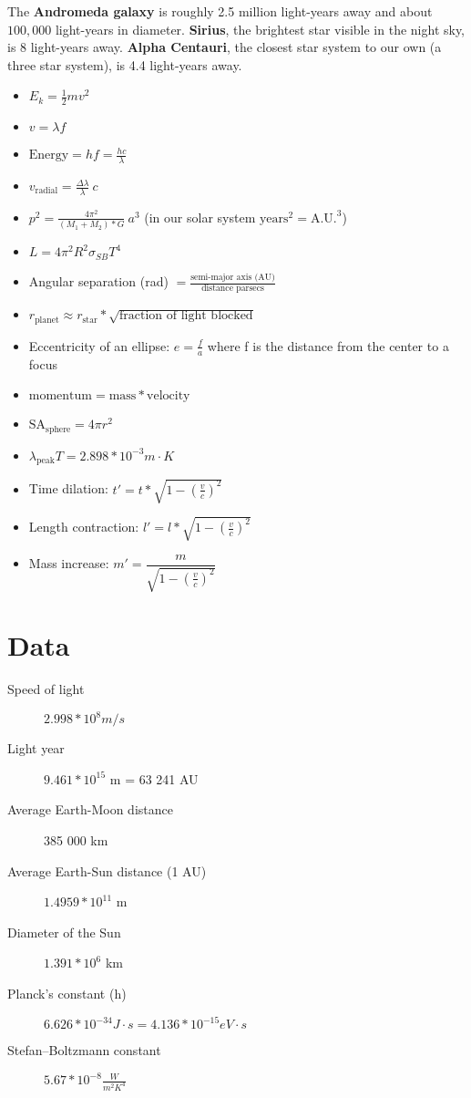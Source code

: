 \documentclass[12pt]{article}
\begin{document}
The {\bf Andromeda galaxy} is roughly 2.5 million light-years away and about $100,000$ light-years in diameter. {\bf Sirius}, the brightest star visible in the night sky, is 8 light-years away. {\bf Alpha Centauri}, the closest star system to our own (a three star system), is 4.4 light-years away.

\begin{itemize}
    \item $E_k = \frac{1}{2}mv^2$
    \item $v = \lambda f$
    \item $\text{Energy} = h f = \frac{hc}{\lambda}$
    \item $v_\text{radial} = \frac{\Delta \lambda}{\lambda}\ c$
    \item $p^2 = \frac{4\pi^2}{(M_1 + M_2) * G}\ a^3$ (in our solar system $\text{years}^2 = \text{A.U.}^3$)
    \item $L = 4\pi^2R^2 \sigma_{SB} T^4$
    \item Angular separation (rad) $= \frac{\text{semi-major axis (AU)}}{\text{distance parsecs}}$
    \item $r_\text{planet} \approx r_\text{star} * \sqrt{\text{fraction of light blocked}}$
    \item Eccentricity of an ellipse: $e = \frac{f}{a}$ where f is the distance from the center to a focus
    \item $\text{momentum} = \text{mass} * \text{velocity}$
    \item $\text{SA}_\text{sphere} = 4 \pi r^2$
    \item $\lambda_\text{peak} T = 2.898 * 10^{-3} m \cdot K$
    \item Time dilation: $t' = t * \sqrt{1 - \left( \frac{v}{c} \right)^2}$
    \item Length contraction: $l' = l * \sqrt{1 - \left( \frac{v}{c} \right)^2}$
    \item Mass increase: $m' = \dfrac{m}{\sqrt{1 - \left( \frac{v}{c} \right)^2}}$
\end{itemize}

\section{Data}

\begin{description}
    \item[Speed of light] $2.998 * 10^8 m/s$
    \item[Light year] $9.461 * 10^{15}$ m = 63 241 AU
    \item[Average Earth-Moon distance] 385 000 km
    \item[Average Earth-Sun distance (1 AU)] $1.4959 * 10^{11}$ m
    \item[Diameter of the Sun] $1.391 * 10^6$ km
    \item[Planck's constant (h)] $6.626 * 10^{-34} J \cdot s = 4.136 * 10^{-15} eV \cdot s$
    \item[Stefan–Boltzmann constant] $5.67 * 10^{-8} \frac{W}{m^2 K^4}$
\end{description}
\end{document}
